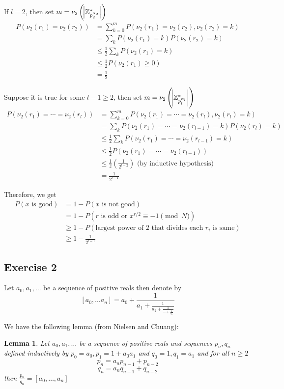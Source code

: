 \documentclass{article}
\newtheorem*{lemma}{Lemma}
\begin{document}
If $l=2$, then set $m = \nu_2\left(\abs{\mathbb{Z}^*_{p_2^{\alpha_2}}}\right)$
\begin{align*}
    P(\nu_2(r_1) = \nu_2(r_2)) &= \sum_{k=0}^m P(\nu_2(r_1) = \nu_2(r_2), \nu_2(r_2) = k) \\
    &= \sum_k P(\nu_2(r_1) = k) P(\nu_2(r_2) = k) \\
    &\leq \frac12 \sum_k P(\nu_2(r_1) = k) \\
    &\leq \frac12 P(\nu_2(r_1) \geq 0) \\
    &= \frac{1}{2}
\end{align*}

Suppose it is true for some $l-1 \geq 2$, then set $m = \nu_2\left(\abs{\mathbb{Z}^*_{p_l^{\alpha_l}}}\right)$
\begin{align*}
    P(\nu_2(r_1) = \cdots = \nu_2(r_l)) &= \sum_{k=0}^m P(\nu_2(r_1) = \cdots = \nu_2(r_l), \nu_2(r_l) = k) \\
    &= \sum_k P(\nu_2(r_1) = \cdots = \nu_2(r_{l-1}) = k) P(\nu_2(r_l) = k) \\
    &\leq \frac12 \sum_k P(\nu_2(r_1) = \cdots = \nu_2(r_{l-1}) = k) \\
    &\leq \frac12 P(\nu_2(r_1) = \cdots = \nu_2(r_{l-1})) \\
    &\leq \frac12 \left(\frac{1}{2^{l-2}}\right) \text{ (by inductive hypothesis)} \\
    &= \frac{1}{2^{l-1}}
\end{align*}

Therefore, we get 
\begin{align*}
    P(x \text{ is good}) &= 1 - P(x \text{ is not good}) \\
    &= 1 - P(r \text{ is odd or } x^{r/2} \equiv -1 \pmod{N}) \\
    &\geq 1 - P(\text{largest power of 2 that divides each } r_i \text{ is same}) \\
    &\geq 1 - \frac{1}{2^{l-1}}
\end{align*}





\subsection*{Exercise 2}

Let $a_0, a_1, \ldots$ be a sequence of positive reals then denote by
$$[a_0, \ldots a_n] = a_0 + \frac{1}{a_1+\frac{1}{a_2 + \frac{1}{\cdots + \frac{1}{a_n}}}}$$

We have the following lemma (from Nielsen and Chuang):
\begin{lemma}
Let $a_0, a_1, \ldots $ be a sequence of positive reals and sequences $p_n, q_n$ defined inductively by $p_0 = a_0, p_1 = 1 + a_0a_1$ and $q_0 = 1, q_1 = a_1$ and for all $n \geq 2$
$$p_n = a_n p_{n-1} + p_{n-2}$$
$$q_n = a_n q_{n-1} + q_{n-2}$$
then $\frac{p_n}{q_n} = [a_0, \ldots, a_n]$
\end{lemma}
\end{document}
